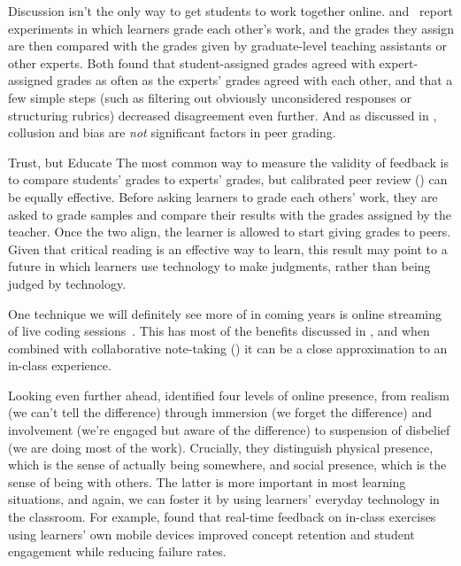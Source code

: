 Discussion isn't the only way to get students to work together online.
\cite{Pare2008} and~\cite{Kulk2013} report experiments
in which learners grade each other's work,
and the grades they assign are then compared with
the grades given by graduate-level teaching assistants or other experts.
Both found that student-assigned grades agreed with expert-assigned grades
as often as the experts' grades agreed with each other,
and that a few simple steps
(such as filtering out obviously unconsidered responses or structuring rubrics)
decreased disagreement even further.
And as discussed in ,
collusion and bias are \emph{not} significant factors in peer grading.

\begin{aside}{Trust, but Educate}
  The most common way to measure the validity of feedback
  is to compare students' grades to experts' grades,
  but calibrated peer review () can be equally effective.
  Before asking learners to grade each others' work,
  they are asked to grade samples and compare their results with the grades assigned by the teacher.
  Once the two align,
  the learner is allowed to start giving grades to peers.
  Given that critical reading is an effective way to learn,
  this result may point to a future in which learners use technology to make judgments,
  rather than being judged by technology.
\end{aside}

One technique we will definitely see more of in coming years is
online streaming of live coding sessions~\cite{Haar2017}.
This has most of the benefits discussed in ,
and when combined with collaborative note-taking ()
it can be a close approximation to an in-class experience.

Looking even further ahead,
\cite{Ijss2000} identified four levels of online presence,
from realism (we can't tell the difference)
through immersion (we forget the difference)
and involvement (we're engaged but aware of the difference)
to suspension of disbelief (we are doing most of the work).
Crucially,
they distinguish physical presence,
which is the sense of actually being somewhere,
and social presence, which is the sense of being with others.
The latter is more important in most learning situations,
and again,
we can foster it by using learners' everyday technology in the classroom.
For example,
\cite{Deb2018} found that real-time feedback on in-class exercises
using learners' own mobile devices
improved concept retention and student engagement while reducing failure rates.

